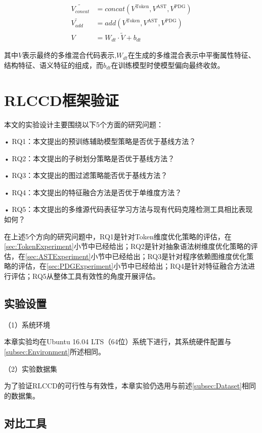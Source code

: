\begin{equation}\label{e6.1}
  \begin{split}
    \tilde{V_{concat}} &= concat \left( V^{\text{Token}} , V^{\text{AST}} , V^{\text{PDG}}\right) \\
    \tilde{V_{add}} &= add \left( V^{\text{Token}} , V^{\text{AST}} , V^{\text{PDG}}\right) \\
    V &= W_{dt} \cdot \tilde{V} + b_{dt}
  \end{split}
\end{equation}

其中$V$表示最终的多维混合代码表示,$W_{dt}$在生成的多维混合表示中平衡属性特征、结构特征、语义特征的组成，而$b_{dt}$在训练模型时使模型偏向最终收敛。

\section{RLCCD框架验证}
本文的实验设计主要围绕以下5个方面的研究问题：

• RQ1：本文提出的预训练辅助模型策略是否优于基线方法？

• RQ2：本文提出的子树划分策略是否优于基线方法？

• RQ3：本文提出的图过滤策略能否优于基线方法？

• RQ4：本文提出的特征融合方法是否优于单维度方法？

• RQ5：本文提出的多维源代码表征学习方法与现有代码克隆检测工具相比表现如何？

在上述5个方向的研究问题中，RQ1是针对Token维度优化策略的评估，在\ref{sec:TokenExperiment}小节中已经给出；RQ2是针对抽象语法树维度优化策略的评估，在\ref{sec:ASTExperiment}小节中已经给出；RQ3是针对程序依赖图维度优化策略的评估，在\ref{sec:PDGExperiment}小节中已经给出；RQ4是针对特征融合方法进行评估；RQ5从整体工具有效性的角度开展评估。

\subsection{实验设置}
（1）系统环境

本章实验均在Ubuntu 16.04 LTS（64位）系统下进行，其系统硬件配置与\ref{subsec:Environment}所述相同。


（2）实验数据集

为了验证RLCCD的可行性与有效性，本章实验仍选用与前述\ref{subsec:Dataset}相同的数据集。

\subsection{对比工具}


